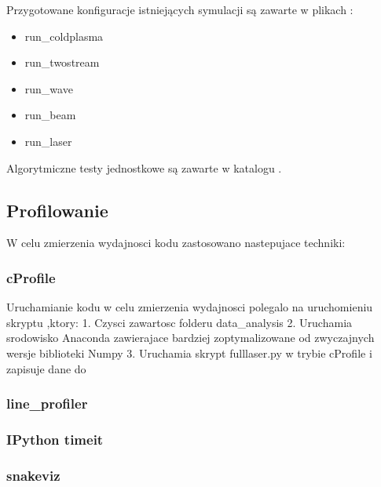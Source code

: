 Przygotowane konfiguracje istniejących symulacji są zawarte w plikach
: 
\begin{itemize}
    \item run\_coldplasma
    \item run\_twostream
    \item run\_wave
    \item run\_beam
    \item run\_laser
\end{itemize}

Algorytmiczne testy jednostkowe są zawarte w katalogu .
\subsection{Profilowanie}
W celu zmierzenia wydajnosci kodu zastosowano nastepujace techniki:
\subsubsection{cProfile}
Uruchamianie kodu w celu zmierzenia wydajnosci polegalo na uruchomieniu skryptu ,ktory:
1. Czysci zawartosc folderu data\_analysis
2. Uruchamia srodowisko Anaconda zawierajace bardziej zoptymalizowane od zwyczajnych wersje biblioteki Numpy
3. Uruchamia skrypt fulllaser.py w trybie cProfile i zapisuje dane do
\subsubsection{line\_profiler}
\subsubsection{IPython timeit}
\subsubsection{snakeviz}

